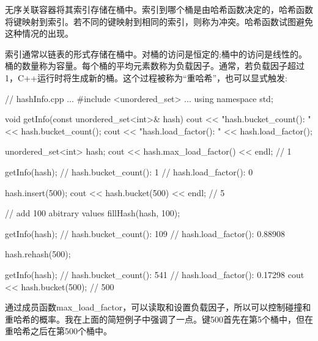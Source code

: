 
无序关联容器将其索引存储在桶中。索引到哪个桶是由哈希函数决定的，哈希函数将键映射到索引。若不同的键映射到相同的索引，则称为冲突。哈希函数试图避免这种情况的出现。

索引通常以链表的形式存储在桶中。对桶的访问是恒定的;桶中的访问是线性的。桶的数量称为容量。每个桶的平均元素数称为负载因子。通常，若负载因子超过1，C++运行时将生成新的桶。这个过程被称为“重哈希”，也可以显式触发:


\begin{cpp}
// hashInfo.cpp
...
#include <unordered_set>
...
using namespace std;

void getInfo(const unordered_set<int>& hash){
	cout << "hash.bucket_count(): " << hash.bucket_count();
	cout << "hash.load_factor(): " << hash.load_factor();
}

unordered_set<int> hash;
cout << hash.max_load_factor() << endl; // 1

getInfo(hash);
	// hash.bucket_count(): 1
	// hash.load_factor(): 0

hash.insert(500);
cout << hash.bucket(500) << endl; // 5

// add 100 abitrary values
fillHash(hash, 100);

getInfo(hash);
	// hash.bucket_count(): 109
	// hash.load_factor(): 0.88908

hash.rehash(500);

getInfo(hash);
	// hash.bucket_count(): 541
	// hash.load_factor(): 0.17298
cout << hash.bucket(500); // 500
\end{cpp}

通过成员函数max\_load\_factor，可以读取和设置负载因子，所以可以控制碰撞和重哈希的概率。我在上面的简短例子中强调了一点。键500首先在第5个桶中，但在重哈希之后在第500个桶中。















